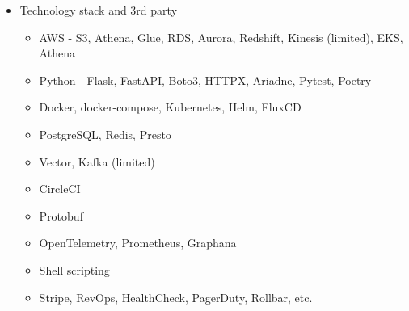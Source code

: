 \documentclass[11pt,a4paper,sans]{moderncv}
\begin{document}
{\begin{itemize}
\begin{itemize}
\begin{itemize}
\begin{itemize}
                            \item set the smoke tests 
                            \item verification with and feedback collection from the product stakeholders
                            \item implement the user rollout strategy
                            \item creating the customer facing documentation
                        \end{itemize}
                    \item Post release support ensuring the defined SLA/SLO
                        \begin{itemize}
                            \item create and participate in on-call schedules
                            \item participate in the CS L2/L3 escalation rotations
                        \end{itemize}
                \end{itemize}
            \end{itemize}
        \item Technology stack and 3rd party
            \begin{itemize}
                \item AWS - S3, Athena, Glue, RDS, Aurora, Redshift, Kinesis (limited), EKS, Athena
                \item Python - Flask, FastAPI, Boto3, HTTPX, Ariadne, Pytest, Poetry
                \item Docker, docker-compose, Kubernetes, Helm, FluxCD
                \item PostgreSQL, Redis, Presto
                \item Vector, Kafka (limited)
                \item CircleCI
                \item Protobuf
                \item OpenTelemetry, Prometheus, Graphana
                \item Shell scripting
                \item Stripe, RevOps, HealthCheck, PagerDuty, Rollbar, etc.
            \end{itemize}
    \end{itemize}
}
\end{document}
